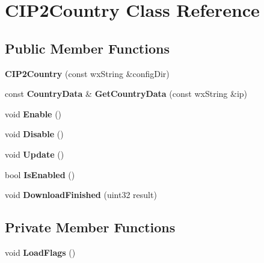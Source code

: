 \section{CIP2Country Class Reference}
\label{classCIP2Country}
\subsection*{Public Member Functions}
\begin{DoxyCompactItemize}
\item 
{\bfseries CIP2Country} (const wxString \&configDir)\label{classCIP2Country_a6b9e179ea26a933a61f7812606c378c3}

\item 
const {\bf CountryData} \& {\bfseries GetCountryData} (const wxString \&ip)\label{classCIP2Country_a2a6b31b5fbc8731c557e5739d325f324}

\item 
void {\bfseries Enable} ()\label{classCIP2Country_a8f63a39e0f78fd750130ce690fffa2a8}

\item 
void {\bfseries Disable} ()\label{classCIP2Country_a043081e5dab4b62d6fa97b7424dcd324}

\item 
void {\bfseries Update} ()\label{classCIP2Country_ab05a5f23f21bd49a6110f00e8f826ac9}

\item 
bool {\bfseries IsEnabled} ()\label{classCIP2Country_a8c1a72f83e989cc9681388489906be1d}

\item 
void {\bfseries DownloadFinished} (uint32 result)\label{classCIP2Country_a00d0c2d1981788ef1c78ca13abeac2e4}

\end{DoxyCompactItemize}
\subsection*{Private Member Functions}
\begin{DoxyCompactItemize}
\item 
void {\bfseries LoadFlags} ()\label{classCIP2Country_a2a9dc2759ed835bc21740fdf4263f0b1}

\end{DoxyCompactItemize}
